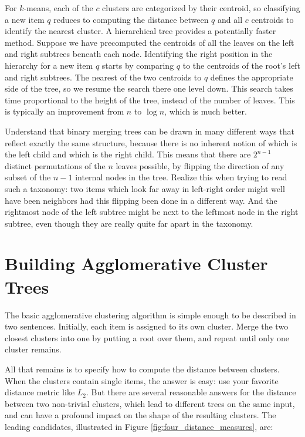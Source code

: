 \documentclass[10pt]{article}
\begin{document}
\begin{itemize}
For $k$-means, each of the $c$ clusters are categorized by their centroid, so classifying a new item $q$ reduces to computing the distance between $q$ and all $c$ centroids to identify the nearest cluster. A hierarchical tree provides a potentially faster method. Suppose we have precomputed the centroids of all the leaves on the left and right subtrees beneath each node. Identifying the right position in the hierarchy for a new item $q$ starts by comparing $q$ to the centroids of the root's left and right subtrees. The nearest of the two centroids to $q$ defines the appropriate side of the tree, so we resume the search there one level down. This search takes time proportional to the height of the tree, instead of the number of leaves. This is typically an improvement from $n$ to $\log n$, which is much better.
\end{itemize}

Understand that binary merging trees can be drawn in many different ways that reflect exactly the same structure, because there is no inherent notion of which is the left child and which is the right child. This means that there are $2^{n-1}$ distinct permutations of the $n$ leaves possible, by flipping the direction of any subset of the $n-1$ internal nodes in the tree. Realize this when trying to read such a taxonomy: two items which look far away in left-right order might well have been neighbors had this flipping been done in a different way. And the rightmost node of the left subtree might be next to the leftmost node in the right subtree, even though they are really quite far apart in the taxonomy.

\section{Building Agglomerative Cluster Trees}

The basic agglomerative clustering algorithm is simple enough to be described in two sentences. Initially, each item is assigned to its own cluster. Merge the two closest clusters into one by putting a root over them, and repeat until only one cluster remains.

All that remains is to specify how to compute the distance between clusters. When the clusters contain single items, the answer is easy: use your favorite distance metric like $L_{2}$. But there are several reasonable answers for the distance between two non-trivial clusters, which lead to different trees on the same input, and can have a profound impact on the shape of the resulting clusters. The leading candidates, illustrated in Figure \ref{fig:four_distance_measures}, are:
\end{document}
